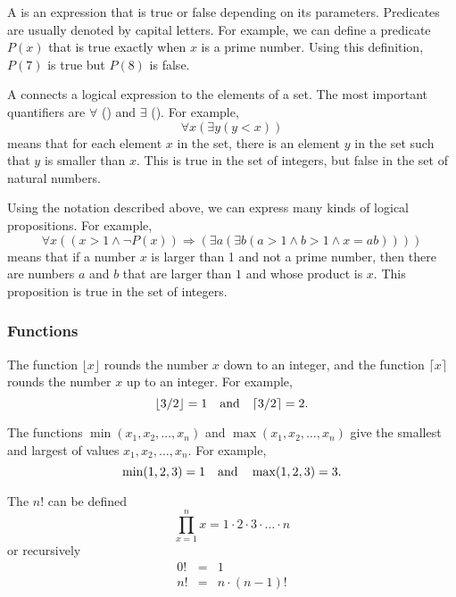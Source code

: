 
A  is an expression that is true or false
depending on its parameters.
Predicates are usually denoted by capital letters.
For example, we can define a predicate $P(x)$
that is true exactly when $x$ is a prime number.
Using this definition, $P(7)$ is true but $P(8)$ is false.


A  connects a logical expression
to the elements of a set.
The most important quantifiers are
$\forall$ () and $\exists$ ().
For example,
\[\forall x (\exists y (y < x))\]
means that for each element $x$ in the set,
there is an element $y$ in the set
such that $y$ is smaller than $x$.
This is true in the set of integers,
but false in the set of natural numbers.

Using the notation described above,
we can express many kinds of logical propositions.
For example,
\[\forall x ((x>1 \land \lnot P(x)) \Rightarrow (\exists a (\exists b (a > 1 \land b > 1 \land x = ab))))\]
means that if a number $x$ is larger than 1
and not a prime number,
then there are numbers $a$ and $b$
that are larger than $1$ and whose product is $x$.
This proposition is true in the set of integers.

\subsubsection{Functions}

The function $\lfloor x \rfloor$ rounds the number $x$
down to an integer, and the function
$\lceil x \rceil$ rounds the number $x$
up to an integer. For example,
\[ \lfloor 3/2 \rfloor = 1 \hspace{10px} \textrm{and} \hspace{10px} \lceil 3/2 \rceil = 2.\]

The functions $\min(x_1,x_2,\ldots,x_n)$
and $\max(x_1,x_2,\ldots,x_n)$
give the smallest and largest of values
$x_1,x_2,\ldots,x_n$.
For example,
\[ \min(1,2,3)=1 \hspace{10px} \textrm{and} \hspace{10px} \max(1,2,3)=3.\]


The  $n!$ can be defined
\[\prod_{x=1}^n x = 1 \cdot 2 \cdot 3 \cdot \ldots \cdot n\]
or recursively
\[
\begin{array}{lcl}
0! & = & 1 \\
n! & = & n \cdot (n-1)! \\
\end{array}
\]

